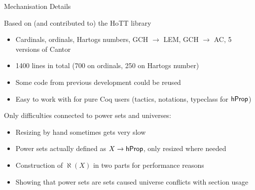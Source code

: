 \documentclass[xcolor=dvipsnames,compress,aspectratio=169,handout]{beamer}
\begin{document}
\begin{frame}{Mechanisation Details}

	\pause
	\vspace{0.25cm}
			Based on (and contributed to) the HoTT library
			\begin{itemize}
				\vspace{0.15cm}
				\item
				Cardinals, ordinals, Hartogs numbers, GCH $\to$ LEM, GCH $\to$ AC, 5 versions of Cantor
				\vspace{0.15cm}
				\item
				1400 lines in total (700 on ordinals, 250 on Hartogs number)
				\vspace{0.15cm}
				\item
				Some code from previous development could be reused
				\vspace{0.15cm}
				\item
				Easy to work with for pure Coq users (tactics, notations, typeclass for $\mathsf{hProp}$)
			\end{itemize}

	\pause
	\vspace{0.5cm}
	Only difficulties connected to power sets and universes:
	\begin{itemize}
		\vspace{0.15cm}
		\item
		Resizing by hand sometimes gets very slow
		\vspace{0.15cm}
		\item
		Power sets actually defined as $X\to\mathsf{hProp}$, only resized where needed
		\vspace{0.15cm}
		\item
		Construction of $\aleph(X)$ in two parts for performance reasons
		\vspace{0.15cm}
		\item
		Showing that power sets are sets caused universe conflicts with section usage
	\end{itemize}
\end{frame}
\end{document}
